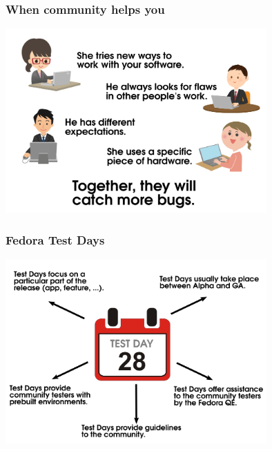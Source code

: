 \documentclass[12pt]{beamer}
\begin{document}
{%
\begin{frame}
\frametitle{When community helps you}
	\begin{center}
		\includegraphics[width=10cm]{images/community.png}
	\end{center}
\end{frame}}


\begin{frame}
\frametitle{Fedora Test Days}
	\begin{center}
	\includegraphics[width=10cm]{images/testdays.png}
	\end{center}
%
\end{frame}
\end{document}
